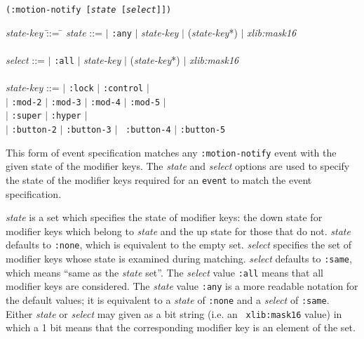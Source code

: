 \documentclass[twoside]{book}
\begin{document}
\begin{sloppy}
{\samepage
{}
{\tt (:motion-notify [{\em state} [{\em select}]])}\\
\hspace*{.75in}
\parbox[t]{5.75in}{
\begin{tabbing}
{\em state-key} \= ::= \= \kill
{\em state}     \>::=  $|$ {\tt :any} $|$ {\em state-key} $|$
                      ({\em state-key}*) $|$ {\em xlib:mask16} \\
\\
{\em select}   \>::=  $|$ {\tt :all} $|$ {\em state-key} $|$
                      ({\em state-key}*) $|$ {\em xlib:mask16} \\
\\
{\em state-key} \>::=  $|$ {\tt :lock} $|$ {\tt :control} $|$ \\
                \>     $|$ {\tt :mod-2} $|$ {\tt :mod-3} $|$ {\tt :mod-4} $|$
{\tt :mod-5} $|$ \\
                \>     $|$ {\tt :super} $|$ {\tt :hyper} $|$\\
                \>     $|$ {\tt :button-2} $|$ {\tt :button-3} $|$ {\tt
:button-4} $|$ {\tt :button-5}\\
\end{tabbing}}
}
\begin{flushright}
\parbox[t]{5.75in}{
This
form of event specification matches any {\tt :motion-notify}
event with the given state of the
modifier keys.
The {\em state} and {\em select} options are used to specify the state of the
modifier keys required for an {\tt event} to match the event specification.
}

\parbox[t]{5.75in}{
{\em state} is a set which specifies the state of modifier keys: the
down state for modifier keys which belong to {\em state} and the up
state for those that do not. 
{\em state} defaults to {\tt :none}, which is equivalent to the empty set.
{\em select} specifies the set of modifier keys whose state is examined
during matching. {\em select} defaults to {\tt :same}, which means
``same as the {\em state} set''. The {\em select} value {\tt :all}
means that
all modifier keys are considered.
The {\em state} value {\tt :any} is a more readable notation for the default
values; it is equivalent to a {\em state} of {\tt :none} and a {\em select} of
{\tt :same}.
Either {\em state} or {\em select} may given as a bit string (i.e. an {\tt
xlib:mask16} value) in which a 1 bit means that the corresponding
modifier key is an element of the set.
}


\end{flushright}
\end{sloppy}
\end{document}
